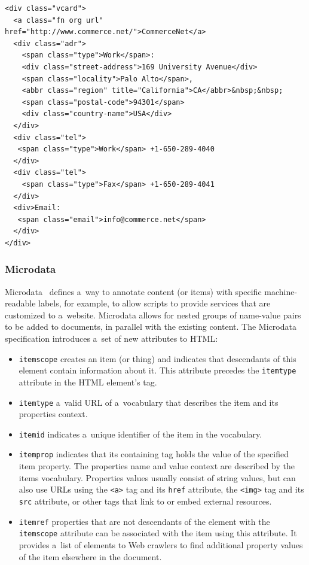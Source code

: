 \begin{lstlisting}[caption={
   [Sample code snippet with embedded hCard Microformat mark-up]
   {Sample code snippet with embedded \texttt{hCard} Microformat
    mark-up (\url{http://microformats.org/wiki/hcard})}
  },
  label={code:microformats}]
<div class="vcard">
  <a class="fn org url" href="http://www.commerce.net/">CommerceNet</a>
  <div class="adr">
    <span class="type">Work</span>:
    <div class="street-address">169 University Avenue</div>
    <span class="locality">Palo Alto</span>,  
    <abbr class="region" title="California">CA</abbr>&nbsp;&nbsp;
    <span class="postal-code">94301</span>
    <div class="country-name">USA</div>
  </div>
  <div class="tel">
   <span class="type">Work</span> +1-650-289-4040
  </div>
  <div class="tel">
    <span class="type">Fax</span> +1-650-289-4041
  </div>
  <div>Email: 
   <span class="email">info@commerce.net</span>
  </div>
</div>
\end{lstlisting}

\subsubsection{Microdata}

Microdata~\cite{hickson2012microdata} defines a~way to annotate 
content (or items) with specific machine-readable labels,
for example, to allow scripts to provide services that are
customized to a~website.
Microdata allows for nested groups of name-value pairs
to be added to documents,
in parallel with the existing content.
The Microdata specification introduces
a~set of new attributes to HTML:

\begin{itemize}
  \item \texttt{itemscope} creates an item (or thing) and
        indicates that descendants of this element contain
        information about it. This attribute precedes the
        \texttt{itemtype} attribute in the HTML element's tag.
  \item \texttt{itemtype} a~valid URL of a~vocabulary that
        describes the item and its properties context.
  \item \texttt{itemid} indicates a~unique identifier
        of the item in the vocabulary.
  \item \texttt{itemprop} indicates that its containing tag
        holds the value of the specified item property.
        The properties name and value context are described by
        the items vocabulary. Properties values usually
        consist of string values,
        but can also use URLs using the \texttt{<a>} tag
        and its \texttt{href} attribute,
        the \texttt{<img>} tag and its \texttt{src} attribute,
        or other tags that link to or embed external resources.
  \item \texttt{itemref} properties that are not descendants of
        the element with the \texttt{itemscope} attribute
        can be associated with the item using this attribute.
        It provides a~list of elements to Web crawlers to find
        additional property values of the item
        elsewhere in the document.
\end{itemize}

